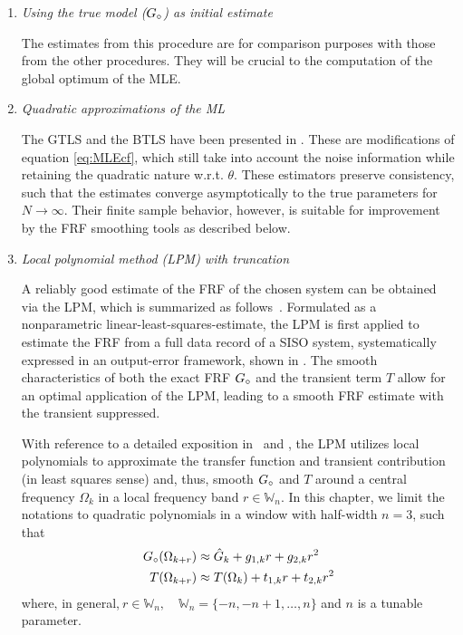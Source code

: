 \begin{enumerate}
\item \emph{Using the true model (${G}_{\circ}$) as initial estimate}

The estimates from this procedure are for comparison purposes with those from the other procedures. They will be crucial to the computation of the global optimum of the \gls{MLE}.

\item \emph{Quadratic approximations of the ML}

The \gls{GTLS} and the \gls{BTLS} have been presented in \citep{Pintelon1998}. 
These are modifications of equation \eqref{eq:MLEcf}, which still take into account the noise information while retaining the quadratic nature w.r.t. $\theta$. 
These estimators preserve consistency, such that the estimates converge asymptotically to the true parameters for $N\to\infty$. 
Their finite sample behavior, however, is suitable for improvement by the \gls{FRF} smoothing tools as described below.

\item \emph{Local polynomial method (LPM) with truncation}

A reliably good estimate of the FRF of the chosen system can be obtained via the LPM, which is summarized as follows~\citep{Lumori2014TIM}. Formulated as a nonparametric linear-least-squares-estimate, the LPM is first applied to estimate the FRF from a full data record of a SISO system, systematically expressed in an output-error framework, shown in . The smooth characteristics of both the exact \gls{FRF} ${G}_{\circ}$ and the transient term $T$ allow for an optimal application of the \gls{LPM}, leading to a smooth \gls{FRF} estimate with the transient suppressed.

  With reference to a detailed exposition in~\citep{Lumori2014TIM} and , the \gls{LPM} utilizes local polynomials to approximate the transfer function and transient contribution (in least squares sense) and, thus, smooth ${G}_{\circ}$ and $T$ around a central frequency $\Omega_{k}$ in a local frequency band $r\in\mathbb{W}_n$.
  In this chapter, we limit the notations to quadratic polynomials in a window with half-width $n=3$, such that
\begin{subequations}\label{lpmImplQuadG}
\begin{align}
{G}_{\circ}(\Omega_{k+r})&\approx \hat G_k + g_{1,k} r + g_{2,k}r^2
\\
T(\Omega_{k+r})&\approx T(\Omega_k)+t_{1,k}r + t_{2,k}r^2\label{lpmImplQuadT}
\end{align}
\end{subequations}
where, in general,$\ r\in\mathbb{W}_n,\quad$$\mathbb{W}_n = \{-n,-n+1,\dots,n\}$ and $n$ is a tunable parameter. 


\end{enumerate}
